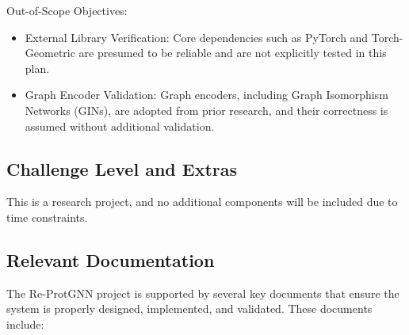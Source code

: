 \documentclass[12pt, titlepage]{article}
\begin{document}

Out-of-Scope Objectives:
\begin{itemize}
    \item External Library Verification: Core dependencies such as PyTorch and Torch-Geometric are presumed to be reliable and are not explicitly tested in this plan.
    \item Graph Encoder Validation: Graph encoders, including Graph Isomorphism Networks (GINs), are adopted from prior research, and their correctness is assumed without additional validation.
\end{itemize}

\subsection{Challenge Level and Extras}
This is a research project, and no additional components will be included due to time constraints.

\subsection{Relevant Documentation}

The Re-ProtGNN project is supported by several key documents that ensure the system is properly designed, implemented, and validated. These documents include:
\end{document}
